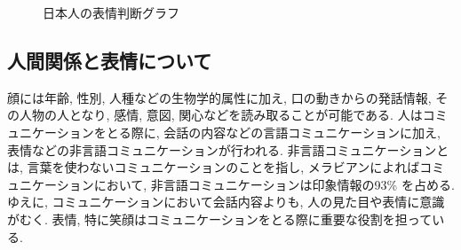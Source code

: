 \begin{figure}[htbp]
    \begin{center}
    \end{center}
    \caption{日本人の表情判断グラフ}
    \label{fig:JapaneseFacialExpression}
\end{figure}

\subsection{人間関係と表情について}
顔には年齢, 性別, 人種などの生物学的属性に加え, 口の動きからの発話情報, その人物の人となり, 感情, 意図, 関心などを読み取ることが可能である.\cite{role_facialexpression_in_communication}
人はコミュニケーションをとる際に, 会話の内容などの言語コミュニケーションに加え, 表情などの非言語コミュニケーションが行われる.
非言語コミュニケーションとは, 言葉を使わないコミュニケーションのことを指し, メラビアンによればコミュニケーションにおいて,
非言語コミュニケーションは印象情報の93\% を占める.\cite {rule_of_Mehrabian}
ゆえに, コミュニケーションにおいて会話内容よりも, 人の見た目や表情に意識がむく.
表情, 特に笑顔はコミュニケーションをとる際に重要な役割を担っている.


